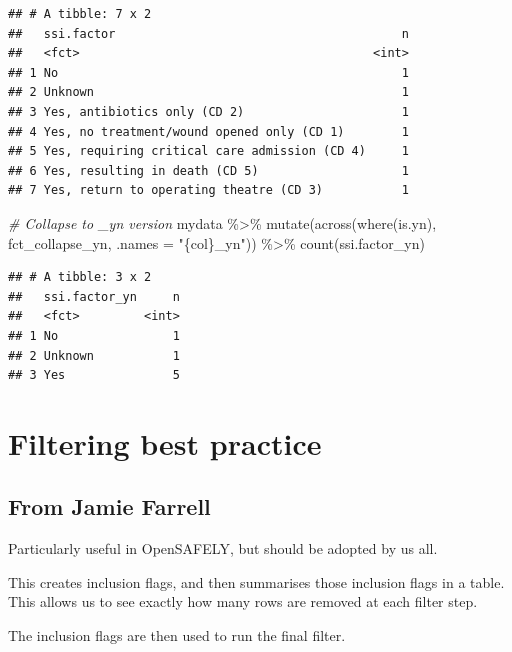 \documentclass[
]{book}
\newenvironment{Shaded}{\begin{snugshade}}{\end{snugshade}}
\newcommand{\AttributeTok}[1]{\textcolor[rgb]{0.77,0.63,0.00}{#1}}
\newcommand{\CommentTok}[1]{\textcolor[rgb]{0.56,0.35,0.01}{\textit{#1}}}
\newcommand{\FunctionTok}[1]{\textcolor[rgb]{0.00,0.00,0.00}{#1}}
\newcommand{\NormalTok}[1]{#1}
\newcommand{\SpecialCharTok}[1]{\textcolor[rgb]{0.00,0.00,0.00}{#1}}
\newcommand{\StringTok}[1]{\textcolor[rgb]{0.31,0.60,0.02}{#1}}
\begin{document}
\begin{verbatim}
## # A tibble: 7 x 2
##   ssi.factor                                        n
##   <fct>                                         <int>
## 1 No                                                1
## 2 Unknown                                           1
## 3 Yes, antibiotics only (CD 2)                      1
## 4 Yes, no treatment/wound opened only (CD 1)        1
## 5 Yes, requiring critical care admission (CD 4)     1
## 6 Yes, resulting in death (CD 5)                    1
## 7 Yes, return to operating theatre (CD 3)           1
\end{verbatim}

\begin{Shaded}
\begin{Highlighting}[]
\CommentTok{\# Collapse to \_yn version}
\NormalTok{mydata }\SpecialCharTok{\%\textgreater{}\%} 
  \FunctionTok{mutate}\NormalTok{(}\FunctionTok{across}\NormalTok{(}\FunctionTok{where}\NormalTok{(is.yn), fct\_collapse\_yn, }\AttributeTok{.names =} \StringTok{"\{col\}\_yn"}\NormalTok{)) }\SpecialCharTok{\%\textgreater{}\%} 
  \FunctionTok{count}\NormalTok{(ssi.factor\_yn)}
\end{Highlighting}
\end{Shaded}

\begin{verbatim}
## # A tibble: 3 x 2
##   ssi.factor_yn     n
##   <fct>         <int>
## 1 No                1
## 2 Unknown           1
## 3 Yes               5
\end{verbatim}

\hypertarget{filtering-best-practice}{%
\section{Filtering best practice}\label{filtering-best-practice}}

\hypertarget{from-jamie-farrell}{%
\subsection{From Jamie Farrell}\label{from-jamie-farrell}}

Particularly useful in OpenSAFELY, but should be adopted by us all.

This creates inclusion flags, and then summarises those inclusion flags in a table. This allows us to see exactly how many rows are removed at each filter step.

The inclusion flags are then used to run the final filter.
\end{document}
